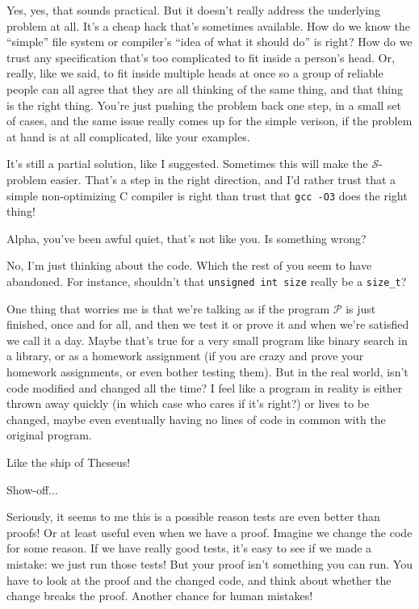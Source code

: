 \documentclass[sigplan]{acmart}
\begin{document}
  Yes, yes, that sounds practical.  But it
doesn't really address the underlying problem at all.  It's a cheap
hack that's sometimes available. How do we know the ``simple''
file system or compiler's ``idea of what it should do'' is right?  How
do we trust any specification that's too complicated to fit inside a
person's head.  Or, really, like we said, to fit inside multiple heads
at once so a group of reliable people can all agree that they are all
thinking of the same thing, and that thing is the right thing.  You're
just pushing the problem back one step, in a small set of cases, and
the same issue really comes up for the simple verison, if the problem
at hand is at all complicated, like your examples.

   It's still a partial solution, like I
suggested. Sometimes this will make the $\mathcal{S}$-problem easier.
That's a step in the right direction, and I'd rather trust that a
simple non-optimizing C compiler is right than trust that {\tt gcc
  -O3} does the right thing!

  Alpha, you've been awful quiet, that's not
like you. Is something wrong?

  No, I'm just thinking about the code.
Which the rest of you seem to have abandoned.  For instance, shouldn't
that {\tt unsigned int size} really be a {\tt size\_t}?

  One thing that worries me is that we're
talking as if the program  $\mathcal{P}$ is just finished, once and
for all, and then we test it or prove it and when we're satisfied we
call it a day.  Maybe that's true for a very small program like binary
search in a library, or as a homework assignment (if you are crazy and
prove your homework assignments, or even bother testing them).  But in
the real world, isn't code modified and changed all the time?  I feel
like a program in reality is either thrown away quickly (in which case
who cares if it's right?) or lives to be changed, maybe even
eventually having no lines of code in common with the original program.

  Like the ship of Theseus!

 Show-off... 

  Seriously, it seems to me this is a possible reason
tests are even better than proofs!  Or at least useful even when we have a proof.
Imagine we change the code for some reason.  If we have really good tests, it's
easy to see if we made a mistake: we just run those tests!  But your
proof isn't something you can run.   You have to look at the proof and
the changed code, and think about whether the change breaks the
proof.  Another chance for human mistakes!
\end{document}
